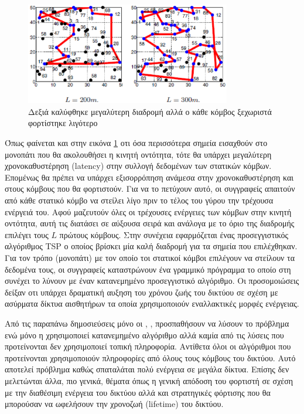 \begin{figure}[h]
	\centering
	\includegraphics[width=0.8\textwidth]{images/yuanyuan_recharg_paths.eps}
	\caption{Δεξιά καλύφθηκε μεγαλύτερη διαδρομή αλλά ο κάθε κόμβος ξεχωριστά φορτίστηκε λιγότερο}
	\label{fig:yuanyuan_recharg_paths}
\end{figure}
Όπως φαίνεται και στην εικόνα \ref{fig:yuanyuan_recharg_paths} οτι όσα περισσότερα σημεία εισαχθούν στο μονοπάτι που θα ακολουθήσει η κινητή οντότητα, τότε θα
υπάρχει μεγαλύτερη χρονοκαθυστέρηση (latency) στην συλλογή δεδομένων των στατικών κόμβων. Επομένως θα πρέπει να υπάρχει εξισορρόπηση ανάμεσα στην χρονοκαθυστέρηση και
στους κόμβους που θα φορτιστούν. Για να το πετύχουν αυτό, οι συγγραφείς απαιτούν από κάθε στατικό κόμβο να στείλει λίγο πριν το τέλος του γύρου την τρέχουσα ενέργειά
του. Αφού μαζευτούν όλες οι τρέχουσες ενέργειες των κόμβων στην κινητή οντότητα, αυτή τις διατάσει σε αύξουσα σειρά και ανάλογα με το όριο της διαδρομής επιλέγει τους
$L$ πρώτους κόμβους. Στην συνέχεια εφαρμόζεται ένας προσεγγιστικός αλγόριθμος TSP ο οποίος βρίσκει μία καλή διαδρομή για τα σημεία που επιλέχθηκαν. Για τον τρόπο
(μονοπάτι) με τον οποίο τοι στατικοί κόμβοι επιλέγουν να στείλουν τα δεδομένα τους, οι συγγραφείς καταστρώνουν ένα γραμμικό πρόγραμμα το οποίο στη συνέχει το λύνουν
με έναν κατανεμημένο προσεγγιστικό αλγόριθμο. Οι προσομοιώσεις δείξαν οτι υπάρχει δραματική αυξηση του χρόνου ζωής του δικτύου σε σχέση με ασύρματα δίκτυα αισθητήρων
τα οποία χρησιμοποιούν εναλλακτικές μορφές ενέργειας.


Από τις παραπάνω δημοσιεύσεις μόνο οι \cite{prolonging_j-roc}, \cite{j-roc}, \cite{yuanyuan_joint} \cite{immortal_wsns} προσπαθήσουν να
λύσουν το πρόβλημα ενώ μόνο η \cite{yuanyuan_joint} χρησιμοποιεί κατανεμημένο αλγόριθμο αλλά  καμία από τις λύσεις που προτείνονται δεν χρησιμοποιεί τοπική
πληροφορία. Αντίθετα όλοι οι αλγόριθμοι που προτείνονται χρησιμοποιούν πληροφορίες από όλους τους κόμβους του δικτύου. Αυτό αποτελεί πρόβλημα καθώς σπαταλάται πολύ
ενέργεια σε μεγάλα δίκτυα. Επίσης δεν μελετώνται άλλα, πιο γενικά, θέματα όπως η γενική απόδοση του φορτιστή σε σχέση με την διαθέσιμη ενέργεια του δικτύου αλλά και
στρατηγικές φόρτισης που θα μπορούσαν να ωφελήσουν την χρονοζωή (lifetime) του δικτύου.

